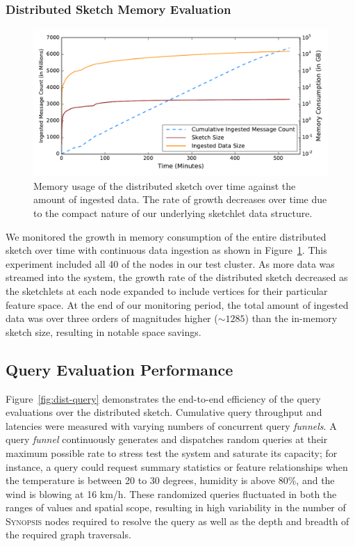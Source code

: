 \subsubsection{Distributed Sketch Memory Evaluation}
%
\begin{figure}[b]
    \centerline{\includegraphics[width=\linewidth]{figures/ing-and-mem-usage.pdf}}
    \caption{Memory usage of the distributed sketch over time against the amount of ingested data. The rate of growth decreases over time due to the compact nature of our underlying sketchlet data structure.}
    \label{fig:dist-sketch-mem-usage}
\end{figure}

We monitored the growth in memory consumption of the entire distributed sketch over time with continuous data ingestion as shown in Figure~\ref{fig:dist-sketch-mem-usage}. This experiment included all 40 of the nodes in our test cluster.  As more data was streamed into the system, the growth rate of the distributed sketch decreased as the sketchlets at each node expanded to include vertices for their particular feature space.  At the end of our monitoring period, the total amount of ingested data was over three orders of magnitudes higher ($\sim 1285$) than the in-memory sketch size, resulting in notable space savings.

\subsection{Query Evaluation Performance}
Figure~\ref{fig:dist-query} demonstrates the end-to-end efficiency of the query evaluations over the distributed sketch.
Cumulative query throughput and latencies were measured with varying numbers of concurrent query \emph{funnels}.
A query \emph{funnel} continuously generates and dispatches random queries at their maximum possible rate to stress test the system and saturate its capacity; for instance, a query could request summary statistics or feature relationships when the temperature is between 20 to 30 degrees, humidity is above 80\%, and the wind is blowing at 16 km/h.
These randomized queries fluctuated in both the ranges of values and spatial scope, resulting in high variability in the number of \textsc{Synopsis} nodes required to resolve the query as well as the depth and breadth of the required graph traversals.

